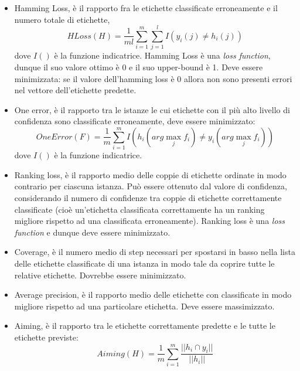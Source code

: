 \begin{itemize}

	\item Hamming Loss, è il rapporto fra le etichette classificate erroneamente e il numero totale di etichette,
	\begin{equation}
		HLoss(H) = \frac{1}{ml}\sum_{i=1}^{m}\sum_{j=1}^{l}I(y_{i}(j)\neq h_{i}(j))
	\end{equation}
	dove $I()$ è la funzione indicatrice. Hamming Loss è una \textit{loss function}, dunque il suo valore ottimo è 0 e il suo upper-bound è 1. Deve essere minimizzata: se il valore dell'hamming loss è 0 allora non sono presenti errori nel vettore dell'etichette predette.
		
	
	\item One error, è il rapporto tra le istanze le cui etichette con il più alto livello di confidenza sono classificate erroneamente, deve essere minimizzato:
	\begin{equation}
		OneError(F) = \frac{1}{m}\sum_{i=1}^{m}I(h_{i}(arg\max_{j}f_{i}) \neq y_{i}(arg\max_{j}f_{i}))
	\end{equation}
	dove $I()$ è la funzione indicatrice.
	
	\item Ranking loss, è il rapporto medio delle coppie di etichette ordinate in modo contrario  per ciascuna istanza. Può essere ottenuto dal valore di confidenza, considerando il numero di confidenze tra coppie di etichette correttamente classificate (cioè un'etichetta classificata correttamente ha un ranking migliore rispetto ad una classificata erroneamente). Ranking loss è una \textit{loss function} e dunque deve essere minimizzato.
	
	\item Coverage, è il numero medio di step necessari per spostarsi in basso nella lista delle etichette classificate di una istanza in modo tale da coprire tutte le relative etichette. Dovrebbe essere minimizzato.
	
	\item Average precision, è il rapporto medio delle etichette con classificate in modo migliore rispetto ad una particolare etichetta. Deve essere massimizzato.	
	
	\item Aiming, è il rapporto tra le etichette correttamente predette e le tutte le etichette previste:
	\begin{equation}
		Aiming(H) = \frac{1}{m}\sum_{i=1}^{m}\frac{||h_{i}\cap y_{i}||}{||h_{i}||}
	\end{equation}
	

\end{itemize}
